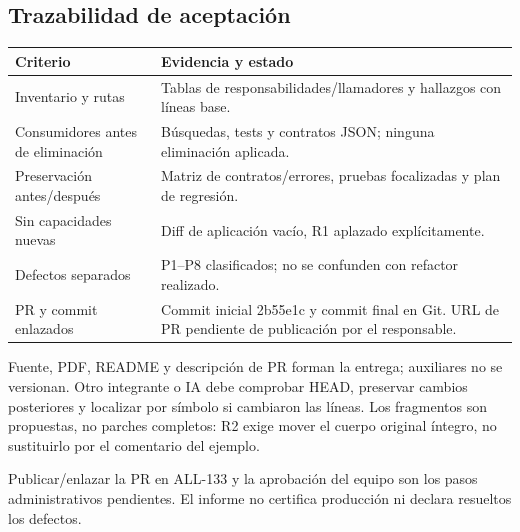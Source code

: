 \documentclass[11pt,a4paper]{article}
\begin{document}
\subsection{Trazabilidad de aceptación}
\begin{longtable}{>{\raggedright\arraybackslash}p{}>{\raggedright\arraybackslash}p{}}
\toprule
Criterio & Evidencia y estado\\ \midrule
Inventario y rutas & Tablas de responsabilidades/llamadores y hallazgos con líneas base.\\
Consumidores antes de eliminación & Búsquedas, tests y contratos JSON; ninguna eliminación aplicada.\\
Preservación antes/después & Matriz de contratos/errores, pruebas focalizadas y plan de regresión.\\
Sin capacidades nuevas & Diff de aplicación vacío, R1 aplazado explícitamente.\\
Defectos separados & P1--P8 clasificados; no se confunden con refactor realizado.\\
PR y commit enlazados & Commit inicial 2b55e1c y commit final en Git. URL de PR pendiente de publicación por el responsable.\\
\bottomrule
\end{longtable}
Fuente, PDF, README y descripción de PR forman la entrega; auxiliares no se versionan. Otro integrante o IA debe comprobar HEAD, preservar cambios posteriores y localizar por símbolo si cambiaron las líneas. Los fragmentos son propuestas, no parches completos: R2 exige mover el cuerpo original íntegro, no sustituirlo por el comentario del ejemplo.

Publicar/enlazar la PR en ALL-133 y la aprobación del equipo son los pasos administrativos pendientes. El informe no certifica producción ni declara resueltos los defectos.
\end{document}
